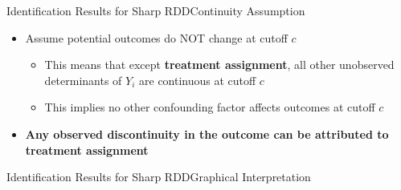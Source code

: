 \documentclass[dvipsnames,hyperref={pdfpagelabels=false}]{beamer}
\begin{document}
\begin{frame}{Identification Results for Sharp RDD}{Continuity Assumption}
	\begin{itemize}
		
		\begin{block}{Continuity Assumption}
			$E[\mathrm{Y}^{1}_{i}|A_{i}]$ and $E[\mathrm{Y}^{0}_{i}|A_{i}]$ are continuous at $A_{i}=c$
		\end{block}
		\item Assume potential outcomes do NOT change at cutoff $c$
		\vspace{0.2cm}
		\begin{itemize}
			\item This means that except \textbf{treatment assignment}, all other unobserved determinants of $Y_{i}$ are continuous at cutoff $c$
			\vspace{0.2cm}
			\item This implies no other confounding factor affects outcomes at cutoff $c$
			\vspace{0.2cm}
		\end{itemize}
		\item \textbf{Any observed discontinuity in the outcome can be attributed to treatment assignment}
		
	\end{itemize}
\end{frame}









\begin{frame}{Identification Results for Sharp RDD}{Graphical Interpretation}
\end{frame}
\end{document}
